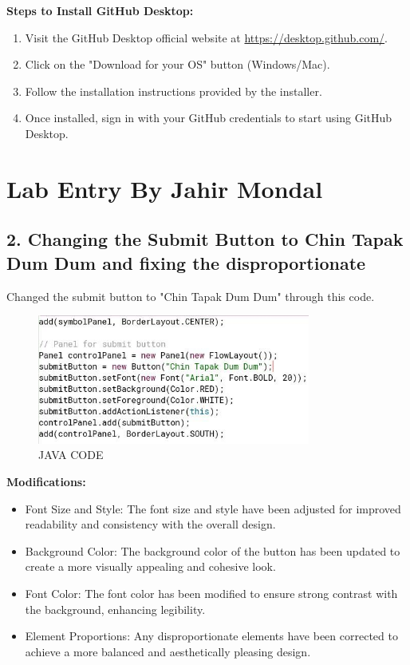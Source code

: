 \documentclass[a4paper,12pt]{article}
\begin{document}
\noindent \textbf{Steps to Install GitHub Desktop:}
\begin{enumerate}
    \item Visit the GitHub Desktop official website at \url{https://desktop.github.com/}.
    \item Click on the "Download for your OS" button (Windows/Mac).
    \item Follow the installation instructions provided by the installer.
    \item Once installed, sign in with your GitHub credentials to start using GitHub Desktop.
\end{enumerate}

\newpage
\section*{Lab Entry By Jahir Mondal}
\subsection*{2. Changing the Submit Button to Chin Tapak Dum Dum and fixing the disproportionate}
Changed the submit button to "Chin Tapak Dum Dum" through this code.

\begin{figure}[h!]
    \centering
    \includegraphics[width=0.8\textwidth]{code.jpeg} %
    \caption{JAVA CODE}
\end{figure}

\noindent\textbf{Modifications:}
\begin{itemize}
    \item Font Size and Style: The font size and style have been adjusted for improved readability and consistency with the overall design.
    \item Background Color: The background color of the button has been updated to create a more visually appealing and cohesive look.
    \item Font Color: The font color has been modified to ensure strong contrast with the background, enhancing legibility.
    \item Element Proportions: Any disproportionate elements have been corrected to achieve a more balanced and aesthetically pleasing design.
\end{itemize}
\end{document}
